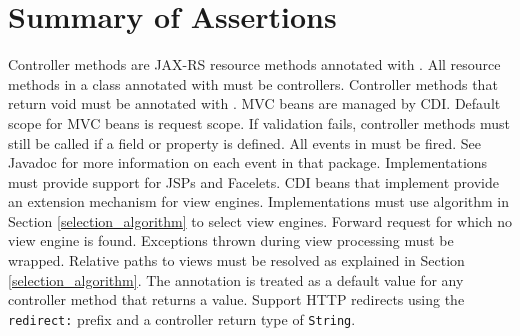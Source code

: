 \chapter{Summary of Assertions}
\label{assertions}

\begin{description}
 Controller methods are JAX-RS resource methods annotated with .
 All resource methods in a class annotated with  must
be controllers.
 Controller methods that return void must be annotated with .
 MVC beans are managed by CDI.
 Default scope for MVC beans is request scope.
 If validation fails, controller methods must still be called if a 
 field or property is defined. 
 All events in  must be fired. See Javadoc for more
information on each event in that package.
 Implementations must provide support for JSPs and Facelets.
 CDI beans that implement  provide
an extension mechanism for view engines.
 Implementations must use algorithm in Section \ref{selection_algorithm} 
to select view engines.
 Forward request for which no view engine is found.
 Exceptions thrown during view processing must be wrapped.
 Relative paths to views must be resolved as explained in 
Section \ref{selection_algorithm}.
 The  annotation is treated as a default value for any controller 
method that returns a  value.
 Support HTTP redirects using the {\tt redirect:} prefix and a controller
return type of {\tt String}.
\end{description}
